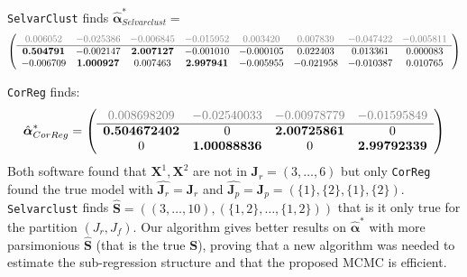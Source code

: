 \documentclass[12pt,a4paper]{report}
\begin{document}
{\tt SelvarClust} finds $\hat{\boldsymbol{\alpha}}^*_{Selvarclust}=$
\begin{displaymath}
	\left (\begin{array}{cccccccc}
	\textcolor{gray}{0.006052} &\textcolor{gray}{-0.025386} &\textcolor{gray}{-0.006845}&\textcolor{gray}{ -0.015952} &\textcolor{gray}{0.003420}& \textcolor{gray}{0.007839} &\textcolor{gray}{-0.047422}& \textcolor{gray}{-0.005811} \\
	\hline
\textbf{0.504791} &-0.002147& \textbf{2.007127} &-0.001010 &-0.000105 &0.022403 &0.013361 &0.000083 \\
-0.006709 &\textbf{1.000927} &0.007463&\textbf{2.997941}& -0.005955 &-0.021958 &-0.010387 &0.010765
	\end{array} \right )
\end{displaymath}		
	
	{\tt CorReg} finds:
\begin{displaymath}
	\hat{\boldsymbol{\alpha}}^*_{CorReg}=\left(
	\begin{array}{cccc}
	\textcolor{gray}{0.008698209} &\textcolor{gray}{-0.02540033} &\textcolor{gray}{-0.00978779} &\textcolor{gray}{-0.01595849} \\
	\hline
 \textbf{0.504672402}  &0&           \textbf{2.00725861} &0          \\
 0&            \textbf{1.00088836}  &0&           \textbf{2.99792339} 
	\end{array} 
	\right)
\end{displaymath}		
Both software found that $\boldsymbol{X}^1,\boldsymbol{X}^2$ are not in $\boldsymbol{J}_r=(3,\dots,6)$ but only {\tt CorReg} found the true model with $\hat{\boldsymbol{J}_r}=\boldsymbol{J}_r$ and $\hat{\boldsymbol{J}_p}=\boldsymbol{J}_p=(\{ 1\},\{ 2\},\{1 \},\{ 2\})$. 
{\tt Selvarclust} finds $\hat{\boldsymbol{S}}=((3,\dots,10),(\{1,2\},\dots,\{1,2\}))$ that is it only true for the partition $(J_r,J_f)$.
Our algorithm gives better results on $\hat{\boldsymbol{\alpha}}^*$ with more parsimonious $\hat{\boldsymbol{S}}$ (that is the true $\boldsymbol{S}$), proving that a new algorithm was needed to estimate the sub-regression structure and that the proposed MCMC is efficient.\\
\end{document}
